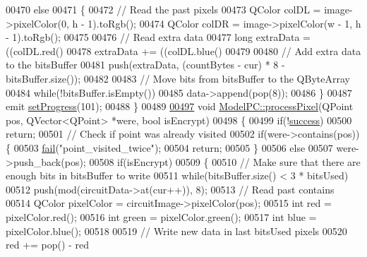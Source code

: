 \begin{DoxyCode}
00470     \textcolor{keywordflow}{else}
00471     \{
00472         \textcolor{comment}{// Read the past pixels}
00473         QColor colDL = image->pixelColor(0, h - 1).toRgb();
00474         QColor colDR = image->pixelColor(w - 1, h - 1).toRgb();
00475 
00476         \textcolor{comment}{// Read extra data}
00477         \textcolor{keywordtype}{long} extraData = ((colDL.red() %
00478         extraData += ((colDL.blue() %
00479 
00480         \textcolor{comment}{// Add extra data to the bitsBuffer}
00481         push(extraData, (countBytes - cur) * 8 - bitsBuffer.size());
00482 
00483         \textcolor{comment}{// Move bits from bitsBuffer to the QByteArray}
00484         \textcolor{keywordflow}{while}(!bitsBuffer.isEmpty())
00485             data->append(pop(8));
00486     \}
00487     emit \hyperlink{class_model_p_c_afdcd80f0ed5062e145a71f09b0897547}{setProgress}(101);
00488 \}
00489 
\hypertarget{modelpc_8cpp_source_l00497}{}\hyperlink{class_model_p_c_a1171f9fe1550133dc9053a46b4e5bcfd}{00497} \textcolor{keywordtype}{void} \hyperlink{class_model_p_c_a1171f9fe1550133dc9053a46b4e5bcfd}{ModelPC::processPixel}(QPoint pos, QVector<QPoint> *were, \textcolor{keywordtype}{bool} isEncrypt)
00498 \{
00499     \textcolor{keywordflow}{if}(!\hyperlink{class_model_p_c_a945ffbbc44a832b953c191debd448f4c}{success})
00500         \textcolor{keywordflow}{return};
00501     \textcolor{comment}{// Check if point was already visited}
00502     \textcolor{keywordflow}{if}(were->contains(pos))\{
00503         \hyperlink{class_model_p_c_a47464b59b7e37fcee25e55475708aabd}{fail}(\textcolor{stringliteral}{"point\_visited\_twice"});
00504         \textcolor{keywordflow}{return};
00505     \}
00506     \textcolor{keywordflow}{else}
00507         were->push\_back(pos);
00508     \textcolor{keywordflow}{if}(isEncrypt)
00509     \{
00510         \textcolor{comment}{// Make sure that there are enough bits in bitsBuffer to write}
00511         \textcolor{keywordflow}{while}(bitsBuffer.size() < 3 * bitsUsed)
00512             push(mod(circuitData->at(cur++)), 8);
00513         \textcolor{comment}{// Read past contains}
00514         QColor pixelColor = circuitImage->pixelColor(pos);
00515         \textcolor{keywordtype}{int} red = pixelColor.red();
00516         \textcolor{keywordtype}{int} green = pixelColor.green();
00517         \textcolor{keywordtype}{int} blue = pixelColor.blue();
00518 
00519         \textcolor{comment}{// Write new data in last bitsUsed pixels}
00520         red += pop() - red %

\end{DoxyCode}

